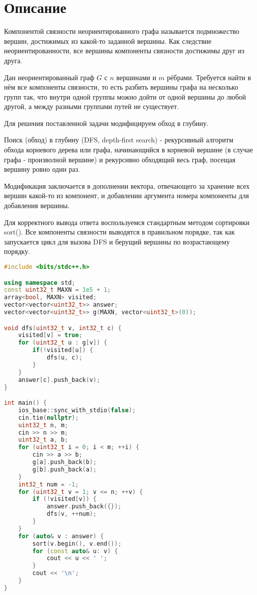 \section{Описание}
Компонентой связности неориентированного графа называется подмножество вершин, достижимых из какой-то заданной вершины. Как следствие неориентированности, все вершины компоненты связности достижимы друг из друга.

Дан неориентированный граф $G$ с $n$ вершинами и $m$ рёбрами. Требуется найти в нём все компоненты связности, то есть разбить вершины графа на несколько групп так, что внутри одной группы можно дойти от одной вершины до любой другой, а между разными группами путей не существует.

Для решения поставленной задачи модифицируем обход в глубину.

Поиск (обход) в глубину (DFS, depth-first search) - рекурсивный алгоритм обхода корневого дерева или графа, начинающийся в корневой вершине (в случае графа - произволной вершине) и рекурсивно обходящий весь граф, посещая вершину ровно один раз.

Модификация заключается в дополнении вектора, отвечающего за хранение всех вершин какой-то из компонент, и добавлении аргумента номера компоненты для добавления вершины.

Для корректного вывода ответа воспользуемся стандартным методом сортировки sort(). Все компоненты связности выводятся в правильном порядке, так как запускается цикл для вызова DFS и берущий вершины по возрастающему порядку.

\begin{lstlisting}[language=C++]
#include <bits/stdc++.h>

using namespace std;
const uint32_t MAXN = 1e5 + 1;
array<bool, MAXN> visited;
vector<vector<uint32_t>> answer;
vector<vector<uint32_t>> g(MAXN, vector<uint32_t>(0)); 

void dfs(uint32_t v, int32_t c) {
	visited[v] = true;
	for (uint32_t u : g[v]) {
		if(!visited[u]) {
			dfs(u, c);
		}
	}
	answer[c].push_back(v);
}

int main() {
	ios_base::sync_with_stdio(false);
	cin.tie(nullptr);
	uint32_t n, m;
	cin >> n >> m;
	uint32_t a, b;
	for (uint32_t i = 0; i < m; ++i) {
		cin >> a >> b;
		g[a].push_back(b);
		g[b].push_back(a);
	}
	int32_t num = -1;
	for (uint32_t v = 1; v <= n; ++v) {
		if (!visited[v]) {
			answer.push_back({});
			dfs(v, ++num);
		}
	}
	for (auto& v : answer) {
		sort(v.begin(), v.end());
		for (const auto& u: v) {
			cout << u << ' ';
		}
		cout << '\n';
	}
}
\end{lstlisting}



